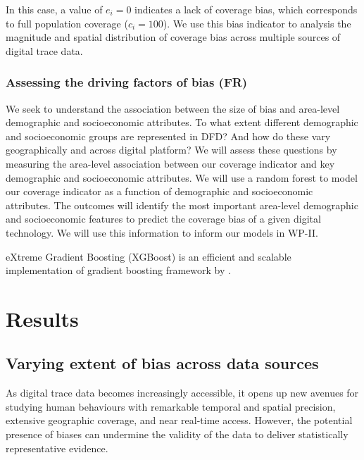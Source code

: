 \documentclass[]{rsos}%
\begin{document}
In this case, a value of \(e_i = 0\) indicates a lack of coverage bias,
which corresponds to full population coverage (\(c_i = 100\)). We use this
bias indicator to analysis the magnitude and spatial distribution of
coverage bias across multiple sources of digital trace data.

\subsubsection{Assessing the driving factors of bias (FR)}\label{assessing-the-driving-factors-of-bias-fr}

We seek to understand the association between the size of bias and
area-level demographic and socioeconomic attributes. To what extent
different demographic and socioeconomic groups are represented in DFD?
And how do these vary geographically and across digital platform? We
will assess these questions by measuring the area-level association
between our coverage indicator and key demographic and socioeconomic
attributes. We will use a random forest to model our coverage indicator
as a function of demographic and socioeconomic attributes. The outcomes
will identify the most important area-level demographic and
socioeconomic features to predict the coverage bias of a given digital
technology. We will use this information to inform our models in WP-II.

eXtreme Gradient Boosting (XGBoost) is an efficient and scalable
implementation of gradient boosting framework by \citep{friedman2001, friedman2000}.

\section{Results}\label{results}

\subsection{Varying extent of bias across data sources}\label{varying-extent-of-bias-across-data-sources}

As digital trace data becomes increasingly accessible, it opens up new
avenues for studying human behaviours with remarkable temporal and
spatial precision, extensive geographic coverage, and near real-time
access. However, the potential presence of biases can undermine the
validity of the data to deliver statistically representative evidence.
\end{document}
